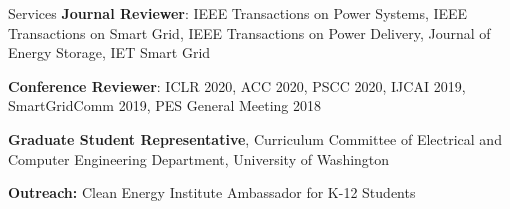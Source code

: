\documentclass{resume} %
\begin{document}
\begin{rSection}{Services}
	\textbf{Journal Reviewer}: IEEE Transactions on Power Systems, IEEE Transactions on Smart Grid, IEEE Transactions on Power Delivery, Journal of Energy Storage, IET Smart Grid
	
	\textbf{Conference Reviewer}: ICLR 2020, ACC 2020, PSCC 2020, IJCAI 2019, SmartGridComm 2019, PES General Meeting 2018
	
	\textbf{Graduate Student Representative}, Curriculum Committee of Electrical and Computer Engineering Department, University of Washington
	
	\textbf{Outreach:} Clean Energy Institute Ambassador for K-12 Students
\end{rSection}    
%	
%	
\end{document}
